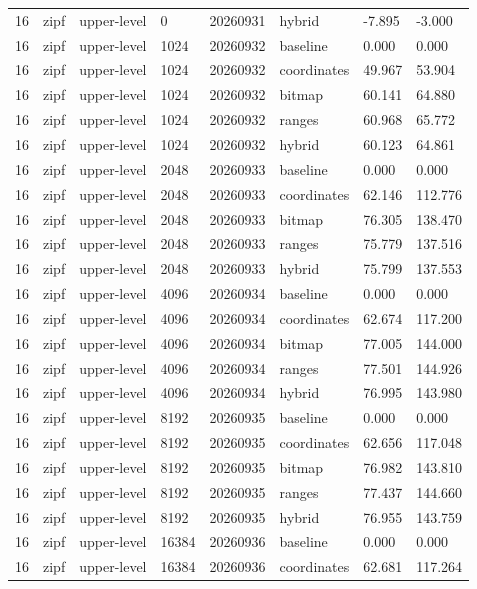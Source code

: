 \begin{tabular}{llllllll}
16 & zipf & upper-level & 0 & 20260931 & hybrid & -7.895 & -3.000 \\
16 & zipf & upper-level & 1024 & 20260932 & baseline & 0.000 & 0.000 \\
16 & zipf & upper-level & 1024 & 20260932 & coordinates & 49.967 & 53.904 \\
16 & zipf & upper-level & 1024 & 20260932 & bitmap & 60.141 & 64.880 \\
16 & zipf & upper-level & 1024 & 20260932 & ranges & 60.968 & 65.772 \\
16 & zipf & upper-level & 1024 & 20260932 & hybrid & 60.123 & 64.861 \\
16 & zipf & upper-level & 2048 & 20260933 & baseline & 0.000 & 0.000 \\
16 & zipf & upper-level & 2048 & 20260933 & coordinates & 62.146 & 112.776 \\
16 & zipf & upper-level & 2048 & 20260933 & bitmap & 76.305 & 138.470 \\
16 & zipf & upper-level & 2048 & 20260933 & ranges & 75.779 & 137.516 \\
16 & zipf & upper-level & 2048 & 20260933 & hybrid & 75.799 & 137.553 \\
16 & zipf & upper-level & 4096 & 20260934 & baseline & 0.000 & 0.000 \\
16 & zipf & upper-level & 4096 & 20260934 & coordinates & 62.674 & 117.200 \\
16 & zipf & upper-level & 4096 & 20260934 & bitmap & 77.005 & 144.000 \\
16 & zipf & upper-level & 4096 & 20260934 & ranges & 77.501 & 144.926 \\
16 & zipf & upper-level & 4096 & 20260934 & hybrid & 76.995 & 143.980 \\
16 & zipf & upper-level & 8192 & 20260935 & baseline & 0.000 & 0.000 \\
16 & zipf & upper-level & 8192 & 20260935 & coordinates & 62.656 & 117.048 \\
16 & zipf & upper-level & 8192 & 20260935 & bitmap & 76.982 & 143.810 \\
16 & zipf & upper-level & 8192 & 20260935 & ranges & 77.437 & 144.660 \\
16 & zipf & upper-level & 8192 & 20260935 & hybrid & 76.955 & 143.759 \\
16 & zipf & upper-level & 16384 & 20260936 & baseline & 0.000 & 0.000 \\
16 & zipf & upper-level & 16384 & 20260936 & coordinates & 62.681 & 117.264 \\

\end{tabular}

